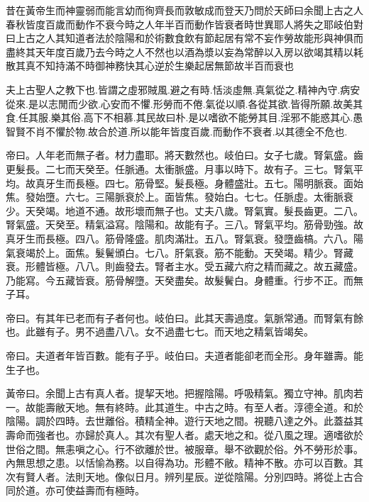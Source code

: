 \documentclass{ctexart}
\begin{document}


\newfontfamily{}
\newfontfamily{}
\begin{withgezhu}
昔在黃帝生而神靈弱而能言幼而徇齊長而敦敏成而登天乃問於天師曰余聞上古之人春秋皆度百歲而動作不衰今時之人年半百而動作皆衰者時世異耶人將失之耶岐伯對曰上古之人其知道者法於陰陽和於術數食飲有節起居有常不妄作勞故能形與神俱而盡終其天年度百歲乃去今時之人不然也以酒為漿以妄為常醉以入房以欲竭其精以耗散其真不知持滿不時御神務快其心逆於生樂起居無節故半百而衰也

夫上古聖人之教下也.皆謂之虛邪賊風.避之有時.恬淡虛無.真氣從之.精神內守.病安從來.是以志閒而少欲.心安而不懼.形勞而不倦.氣從以順.各從其欲.皆得所願.故美其食.任其服.樂其俗.高下不相慕.其民故曰朴.是以嗜欲不能勞其目.淫邪不能惑其心.愚智賢不肖不懼於物.故合於道.所以能年皆度百歲.而動作不衰者.以其德全不危也.

帝曰。人年老而無子者。材力盡耶。將天數然也。岐伯曰。女子七歲。腎氣盛。齒更髮長。二七而天癸至。任脈通。太衝脈盛。月事以時下。故有子。三七。腎氣平均。故真牙生而長極。四七。筋骨堅。髮長極。身體盛壯。五七。陽明脈衰。面始焦。發始墮。六七。三陽脈衰於上。面皆焦。發始白。七七。任脈虛。太衝脈衰少。天癸竭。地道不通。故形壞而無子也。丈夫八歲。腎氣實。髮長齒更。二八。腎氣盛。天癸至。精氣溢寫。陰陽和。故能有子。三八。腎氣平均。筋骨勁強。故真牙生而長極。四八。筋骨隆盛。肌肉滿壯。五八。腎氣衰。發墮齒槁。六八。陽氣衰竭於上。面焦。髮鬢頒白。七八。肝氣衰。筋不能動。天癸竭。精少。腎藏衰。形體皆極。八八。則齒發去。腎者主水。受五藏六府之精而藏之。故五藏盛。乃能寫。今五藏皆衰。筋骨解墮。天癸盡矣。故髮鬢白。身體重。行步不正。而無子耳。

帝曰。有其年已老而有子者何也。岐伯曰。此其天壽過度。氣脈常通。而腎氣有餘也。此雖有子。男不過盡八八。女不過盡七七。而天地之精氣皆竭矣。

帝曰。夫道者年皆百數。能有子乎。岐伯曰。夫道者能卻老而全形。身年雖壽。能生子也。

黃帝曰。余聞上古有真人者。提挈天地。把握陰陽。呼吸精氣。獨立守神。肌肉若一。故能壽敝天地。無有終時。此其道生。中古之時。有至人者。淳德全道。和於陰陽。調於四時。去世離俗。積精全神。遊行天地之間。視聽八達之外。此蓋益其壽命而強者也。亦歸於真人。其次有聖人者。處天地之和。從八風之理。適嗜欲於世俗之間。無恚嗔之心。行不欲離於世。被服章。舉不欲觀於俗。外不勞形於事。內無思想之患。以恬愉為務。以自得為功。形體不敝。精神不散。亦可以百數。其次有賢人者。法則天地。像似日月。辨列星辰。逆從陰陽。分別四時。將從上古合同於道。亦可使益壽而有極時。


\end{withgezhu}
\end{document}
